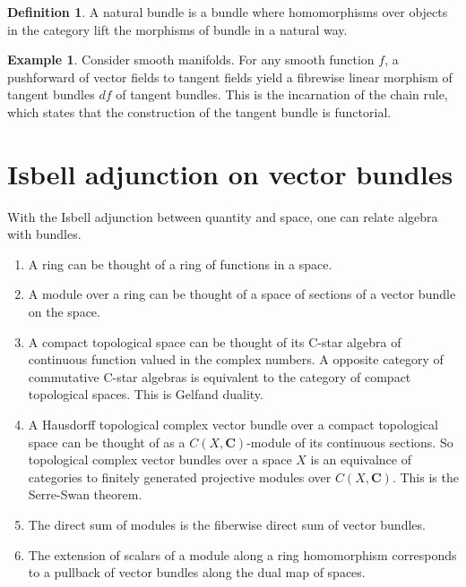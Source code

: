 \documentclass[10pt]{article}
\theoremstyle{plain}%
\theoremstyle{definition}
\newtheorem{definition}{Definition}[section]
\newtheorem{example}{Example}[section]
\theoremstyle{remark}
\begin{document}
\begin{definition}
	A natural bundle is a bundle where homomorphisms over objects in the category lift the morphisms of bundle in a natural way.
\end{definition}

\begin{example}
	Consider smooth manifolds. For any smooth function $f$, a pushforward of vector fields to tangent fields yield a fibrewise linear morphism of tangent bundles $df$ of tangent bundles. This is the incarnation of the chain rule, which states that the construction of the tangent bundle is functorial.
\end{example}

\section{Isbell adjunction on vector bundles}

With the Isbell adjunction between quantity and space, one can relate algebra with bundles.

\begin{enumerate}
	\item A ring can be thought of a ring of functions in a space.
	\item A module over a ring can be thought of a space of sections of a vector bundle on the space.
	\item A compact topological space can be thought of its C-star algebra of continuous function valued in the complex numbers. A opposite category of commutative C-star algebras is equivalent to the category of compact topological spaces. This is Gelfand duality.
	\item A Hausdorff topological complex vector bundle over a compact topological space can be thought of as a $C(X, \mathbf{C})$-module of its continuous sections. So topological complex vector bundles over a space $X$ is an equivalnce of categories to finitely generated projective modules over $C(X, \mathbf{C})$. This is the Serre-Swan theorem.
	\item The direct sum of modules is the fiberwise direct sum of vector bundles.
	\item The extension of scalars of a module along a ring homomorphism corresponds to a pullback of vector bundles along the dual map of spaces.
\end{enumerate}
\end{document}
